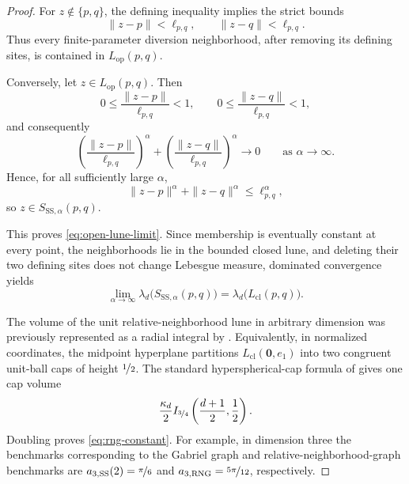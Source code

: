 \documentclass[a4paper,fleqn]{cas-dc}
\theoremstyle{definition}
\theoremstyle{remark}
\newcommand{\R}{\mathds{R}}
\newcommand{\0}{\mathbf{0}}
\begin{document}
\begin{proof}
For $z\notin\{p,q\}$, the defining inequality implies the strict bounds
\begin{equation}
\|z-p\|< \ell_{p,q},
\qquad
\|z-q\|< \ell_{p,q}.
\end{equation}
Thus every finite-parameter diversion neighborhood, after removing its defining
sites, is contained in $L_{\mathrm{op}}(p,q)$.

Conversely, let \(z\in L_{\mathrm{op}}(p,q)\). Then
\begin{equation}
0\leq \frac{\|z-p\|}{\ell_{p,q}}<1,
\qquad
0\leq \frac{\|z-q\|}{\ell_{p,q}}<1,
\end{equation}
and consequently
\begin{equation}
\left(\frac{\|z-p\|}{\ell_{p,q}}\right)^\alpha
+
\left(\frac{\|z-q\|}{\ell_{p,q}}\right)^\alpha
\longrightarrow 0
\qquad\text{as }\alpha\to\infty.
\end{equation}
Hence, for all sufficiently large \(\alpha\),
\begin{equation}
\|z-p\|^\alpha+\|z-q\|^\alpha
\leq \ell_{p,q}^\alpha,
\end{equation}
so \(z\in S_{\mathrm{SS},\alpha}(p,q)\).

This proves \eqref{eq:open-lune-limit}. Since membership is eventually
constant at every point, the neighborhoods lie in the bounded closed lune,
and deleting their two defining sites does not change Lebesgue measure,
dominated convergence yields
\begin{equation}
    \lim_{\alpha\to\infty}
    \lambda_d\bigl(S_{\mathrm{SS},\alpha}(p,q)\bigr)
    =
    \lambda_d\bigl(L_{\mathrm{cl}}(p,q)\bigr).
\end{equation}

The volume of the unit relative-neighborhood lune in arbitrary dimension was
previously represented as a radial integral by
\citet[Sec.~5, p.~59]{devroye1988expected}. Equivalently, in normalized
coordinates, the midpoint hyperplane partitions
$L_{\mathrm{cl}}(\0,e_1)$ into two congruent unit-ball caps of height $\nicefrac{1}{2}$.
The standard hyperspherical-cap formula of \citet{li2011concise} gives one cap
volume
\begin{equation}
\frac{\kappa_d}{2}
I_{\nicefrac{3}{4}}\left(\frac{d+1}{2},\frac12\right).
\end{equation}
Doubling proves \eqref{eq:rng-constant}. For example, in dimension three the benchmarks corresponding to the Gabriel graph and relative-neighborhood-graph benchmarks are $a_{3,\mathrm{SS}}(2)=\nicefrac{\pi}{6}$ and
$a_{3,\mathrm{RNG}}=\nicefrac{5\pi}{12}$, respectively.
\end{proof}
\end{document}
